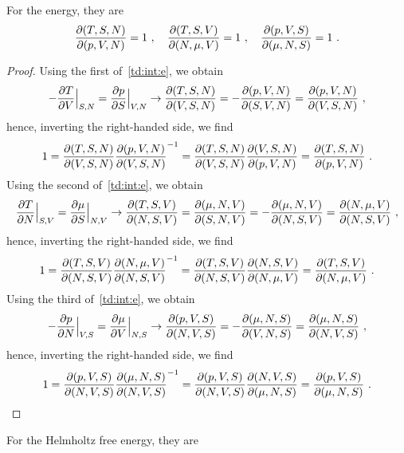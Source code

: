     For the energy, they are 
    \begin{equation*}
        \frac{\partial(T, S, N)}{\partial(p, V, N)} = 1 ~, \quad \frac{\partial(T, S, V)}{\partial(N, \mu, V)} = 1 ~, \quad \frac{\partial(p, V, S)}{\partial(\mu, N, S)} = 1 ~.
    \end{equation*}
    \begin{proof}
        Using the first of~\eqref{td:int:e}, we obtain
        \begin{equation*}
            - \frac{\partial T}{\partial V} \Big \vert_{S, N} = \frac{\partial p}{\partial S} \Big \vert_{V, N} \rightarrow \frac{\partial(T, S, N)}{\partial(V, S, N)} = - \frac{\partial(p, V, N)}{\partial(S, V, N)} = \frac{\partial(p, V, N)}{\partial(V, S, N)} ~,
        \end{equation*} 
        hence, inverting the right-handed side, we find
        \begin{equation*}
            1 = \frac{\partial(T, S, N)}{\partial(V, S, N)} \frac{\partial(p, V, N)}{\partial(V, S, N)}^{-1} = \frac{\partial(T, S, N)}{\partial(V, S, N)} \frac{\partial(V, S, N)}{\partial(p, V, N)} = \frac{\partial(T, S, N)}{\partial(p, V, N)} ~.
        \end{equation*} 
        Using the second of~\eqref{td:int:e}, we obtain
        \begin{equation*}
            \frac{\partial T}{\partial N} \Big \vert_{S, V} = \frac{\partial\mu}{\partial S} \Big \vert_{N, V} \rightarrow \frac{\partial(T, S, V)}{\partial(N, S, V)} = \frac{\partial(\mu, N, V)}{\partial(S, N, V)} = - \frac{\partial(\mu, N, V)}{\partial(N, S, V)} = \frac{\partial(N, \mu, V)}{\partial(N, S, V)} ~,
        \end{equation*} 
        hence, inverting the right-handed side, we find
        \begin{equation*}
            1 = \frac{\partial(T, S, V)}{\partial(N, S, V)} \frac{\partial(N, \mu, V)}{\partial(N, S, V)}^{-1} = \frac{\partial(T, S, V)}{\partial(N, S, V)} \frac{\partial(N, S, V)}{\partial(N, \mu, V)} = \frac{\partial(T, S, V)}{\partial(N, \mu, V)} ~.
        \end{equation*} 
        Using the third of~\eqref{td:int:e}, we obtain
        \begin{equation*}
            - \frac{\partial p}{\partial N} \Big \vert_{V, S} = \frac{\partial\mu}{\partial V} \Big \vert_{N, S} \rightarrow \frac{\partial(p, V, S)}{\partial(N, V, S)} = - \frac{\partial(\mu, N, S)}{\partial(V, N ,S)} = \frac{\partial(\mu, N, S)}{\partial(N, V ,S)} ~,
        \end{equation*} 
        hence, inverting the right-handed side, we find
        \begin{equation*}
            1 = \frac{\partial(p, V, S)}{\partial(N, V, S)} \frac{\partial(\mu, N, S)}{\partial(N, V ,S)}^{-1} = \frac{\partial(p, V, S)}{\partial(N, V, S)} \frac{\partial(N, V ,S)}{\partial(\mu, N, S)} = \frac{\partial(p, V, S)}{\partial(\mu, N, S)} ~.
        \end{equation*} 
    \end{proof}
    For the Helmholtz free energy, they are 
